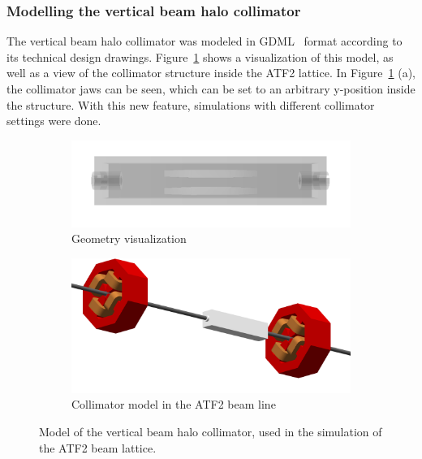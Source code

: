 \subsubsection{Modelling the vertical beam halo collimator}
The vertical beam halo collimator was modeled in GDML~\cite{GDML,GDML_web} format according to its technical design drawings.
Figure~\ref{fig:Collimator_model} shows a visualization of this model, as well as a view of the collimator structure inside the ATF2 lattice.
In Figure~\ref{fig:Collimator_model} (a), the collimator jaws can be seen, which can be set to an arbitrary y-position inside the structure.
With this new feature, \bdsim simulations with different collimator settings were done.
\begin{figure}[!h]
\centering
\begin{subfigure}[b]{0.49\textwidth}
 \centering
 \includegraphics[width=\textwidth]{Figures/ATF/Collimator_model.pdf}
 \caption{Geometry visualization}
\end{subfigure}
\hfill
\begin{subfigure}[b]{0.49\textwidth}
  \centering
 \includegraphics[width=\textwidth]{Figures/ATF/Collimator_in_ATF2.pdf}
 \caption{Collimator model in the ATF2 beam line}
\end{subfigure}
\caption[Model of the vertical beam halo collimator used in the \bdsim simulation]{Model of the vertical beam halo collimator, used in the \bdsim simulation of the ATF2 beam lattice.
}
\label{fig:Collimator_model}
\end{figure}

